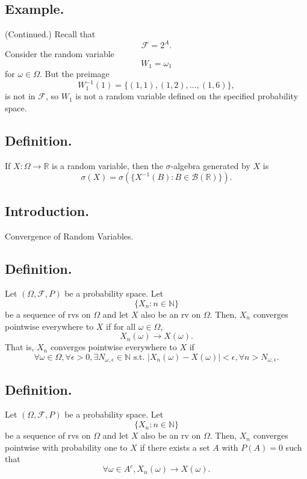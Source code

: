 \documentclass[titlepage]{article}
\begin{document}
\subsection{Example.} (Continued.) Recall that 
$$\mathcal{F} = 2^{A}.$$
Consider the random variable $$W_{1} = \omega_{1}$$
for $\omega \in \Omega$. But the preimage 
$$W_{1}^{-1}(1) = \{(1, 1), (1, 2), \ldots, (1, 6)\},$$
is not in $\mathcal{F}$, so $W_{1}$ is not a random variable defined on the specified probability space.

\subsection{Definition.} If $X: \Omega \to \mathbb{R}$ is a random variable, then the $\sigma$-algebra generated by $X$ is 
$$\sigma(X) = \sigma\left(\{X^{-1}(B): B \in \mathcal{B}(\mathbb{R})\}\right).$$

\newpage {}

\subsection{Introduction.} Convergence of Random Variables.

\subsection{Definition.} Let $(\Omega, \mathcal{F}, P)$ be a probability space. Let 
$$\{X_{n}: n \in \mathbb{N}\}$$
be a sequence of rvs on $\Omega$ and let $X$ also be an rv on $\Omega$. Then, $X_{n}$ converges pointwise everywhere to $X$ if for all $\omega \in \Omega$,
$$X_{n}(\omega) \to X(\omega).$$
That is, $X_{n}$ converges pointwise everywhere to $X$ if 
$$\forall \omega \in \Omega, \forall \epsilon > 0, \exists N_{\omega,\epsilon} \in \mathbb{N} \text{ s.t. } |X_{n}(\omega) - X(\omega)| < \epsilon, \forall n > N_{\omega,\epsilon}.$$

\subsection{Definition.} Let $(\Omega, \mathcal{F}, P)$ be a probability space. Let 
$$\{X_{n}: n \in \mathbb{N}\}$$
be a sequence of rvs on $\Omega$ and let $X$ also be an rv on $\Omega$. Then, $X_{n}$ converges pointwise with probability one to $X$ if there exists a set $A$ with $P(A) = 0$ such that 
$$\forall \omega \in A^{c}, X_{n}(\omega) \to X(\omega).$$
\end{document}
